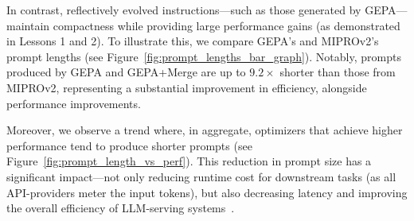 \documentclass{article} %
\begin{document}
In contrast, reflectively evolved instructions—such as those generated by GEPA—maintain compactness while providing large performance gains (as demonstrated in Lessons 1 and 2). To illustrate this, we compare GEPA's and MIPROv2's prompt lengths (see Figure~\ref{fig:prompt_lengths_bar_graph}). Notably, prompts produced by GEPA and GEPA+Merge are up to $9.2\times$ shorter than those from MIPROv2, representing a substantial improvement in efficiency, alongside performance improvements. 

Moreover, we observe a trend where, in aggregate, optimizers that achieve higher performance tend to produce shorter prompts (see Figure~\ref{fig:prompt_length_vs_perf}). This reduction in prompt size has a significant impact—not only reducing runtime cost for downstream tasks (as all API-providers meter the input tokens), but also decreasing latency and improving the overall efficiency of LLM-serving systems~\citep{vllm, sglang, sarathi, pensieve}.

\end{document}
